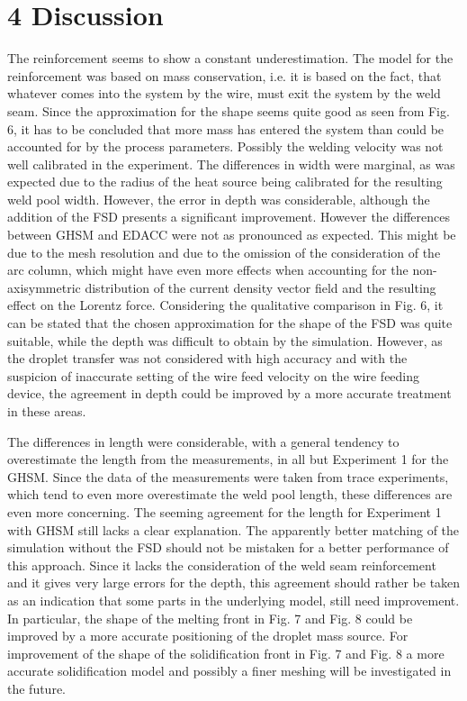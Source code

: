 \documentclass[10pt]{article}
\begin{document}
\section*{4 Discussion}
The reinforcement seems to show a constant underestimation. The model for the reinforcement was based on mass conservation, i.e. it is based on the fact, that whatever comes into the system by the wire, must exit the system by the weld seam. Since the approximation for the shape seems quite good as seen from Fig. 6, it has to be concluded that more mass has entered the system than could be accounted for by the process parameters. Possibly the welding velocity was not well calibrated in the experiment. The differences in width were marginal, as was expected due to the radius of the heat source being calibrated for the resulting weld pool width. However, the error in depth was considerable, although the addition of the FSD presents a significant improvement. However the differences between GHSM and EDACC were not as pronounced as expected. This might be due to the mesh resolution and due to the omission of the consideration of the arc column, which might have even more effects when accounting for the non-axisymmetric distribution of the current density vector field and the resulting effect on the Lorentz force. Considering the qualitative comparison in Fig. 6, it can be stated that the chosen approximation for the shape of the FSD was quite suitable, while the depth was difficult to obtain by the simulation. However, as the droplet transfer was not considered with high accuracy and with the suspicion of inaccurate setting of the wire feed velocity on the wire feeding device, the agreement in depth could be improved by a more accurate treatment in these areas.

The differences in length were considerable, with a general tendency to overestimate the length from the measurements, in all but Experiment 1 for the GHSM. Since the data of the measurements were taken from trace experiments, which tend to even more overestimate the weld pool length, these differences are even more concerning. The seeming agreement for the length for Experiment 1 with GHSM still lacks a clear explanation. The apparently better matching of the simulation without the FSD should not be mistaken for a better performance of this approach. Since it lacks the consideration of the weld seam reinforcement and it gives very large errors for the depth, this agreement should rather be taken as an indication that some parts in the underlying model, still need improvement. In particular, the shape of the melting front in Fig. 7 and Fig. 8 could be improved by a more accurate positioning of the droplet mass source. For improvement of the shape of the solidification front in Fig. 7 and Fig. 8 a more accurate solidification model and possibly a finer meshing will be investigated in the future.
\end{document}
